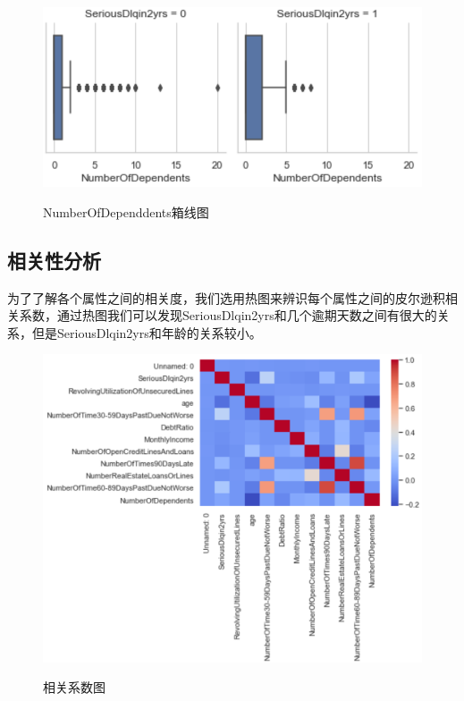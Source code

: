 \documentclass{zjureport}
\begin{document}
\begin{clause}
     \begin{figure}[H]
    \centering
    \includegraphics[scale=0.7]{figures/image12.png}\\
    \caption{NumberOfDependdents箱线图}
    \end{figure}
\end{clause}
\subsection{相关性分析}
    为了了解各个属性之间的相关度，我们选用热图来辨识每个属性之间的皮尔逊积相关系数，通过热图我们可以发现SeriousDlqin2yrs和几个逾期天数之间有很大的关系，但是SeriousDlqin2yrs和年龄的关系较小。
    \begin{figure}[H]
    \centering
    \includegraphics[scale=0.6]{figures/image13.png}\\
    \caption{相关系数图}
    \end{figure}
\end{document}
